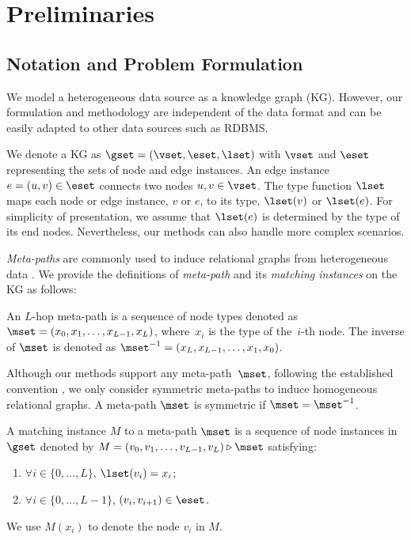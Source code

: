 \section{Preliminaries}
\label{sec:preli}

\subsection{Notation and Problem Formulation}

We model a heterogeneous data source as a knowledge graph (KG).
However, our formulation and methodology are independent of the data format and can be easily adapted to other data sources such as RDBMS.

We denote a KG as $\gset=(\vset, \eset, \lset)$ with $\vset$ and $\eset$ representing the sets of node and edge instances.
An edge instance $e = (u, v) \in \eset$ connects two nodes $u, v \in \vset$.
The type function $\lset$ maps each node or edge instance, $v$ or $e$, to its type, $\lset(v)$ or $\lset(e)$.
For simplicity of presentation, we assume that $\lset(e)$ is determined by the type of its end nodes.
Nevertheless, our methods can also handle more complex scenarios.

\emph{Meta-paths} are commonly used to induce relational graphs from heterogeneous data \cite{fang2020effective, yang2020effective}.
We provide the definitions of \emph{meta-path} and its \emph{matching instances} on the KG as follows:
\begin{definition}
  An $L$-hop meta-path is a sequence of node types denoted as $\mset=(x_0, x_1, \dots, x_{L-1}, x_{L})$, where~$x_i$ is the type of the~$i$-th node. The inverse of $\mset$ is denoted as $\mset^{-1}=(x_L, x_{L-1}, \dots, x_1,x_0)$. 
\end{definition}
Although our methods support any meta-path~$\mset$, following the established convention \cite{fang2020effective, yang2020effective,jiang2022effective}, we only consider symmetric meta-paths to induce homogeneous relational graphs. A meta-path $\mset$ is symmetric if $\mset=\mset^{-1}$.
\begin{definition}
  A matching instance $M$ to a meta-path $\mset$ is a sequence of node instances in $\gset$ denoted by $M=(v_0, v_1,\dots,v_{L-1}, v_L) \triangleright \mset$ satisfying:
  \begin{enumerate}
    \item $\forall i\in\{0, \dots,L\}$, $\lset(v_i)=x_i$;
    \item $\forall i\in\{0, \dots,L-1\}$, $(v_i, v_{i+1}) \in \eset$.
  \end{enumerate}
  We use $M(x_i)$ to denote the node $v_i$ in $M$.
\end{definition}

